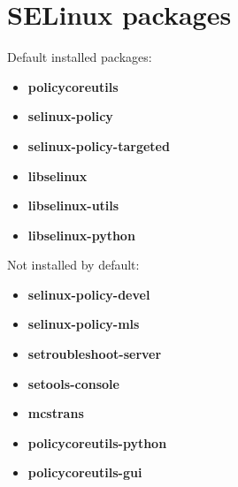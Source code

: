 \section{SELinux packages}
Default installed packages:
\begin{itemize}
	\item \textbf{policycoreutils}
	\item \textbf{selinux-policy}
	\item \textbf{selinux-policy-targeted}
	\item \textbf{libselinux}
	\item \textbf{libselinux-utils}
	\item \textbf{libselinux-python}
\end{itemize}

\noindent Not installed by default:
\begin{itemize}
	\item \textbf{selinux-policy-devel}
	\item \textbf{selinux-policy-mls}
	\item \textbf{setroubleshoot-server}
	\item \textbf{setools-console}
	\item \textbf{mcstrans}
	\item \textbf{policycoreutils-python}
	\item \textbf{policycoreutils-gui}
\end{itemize}
